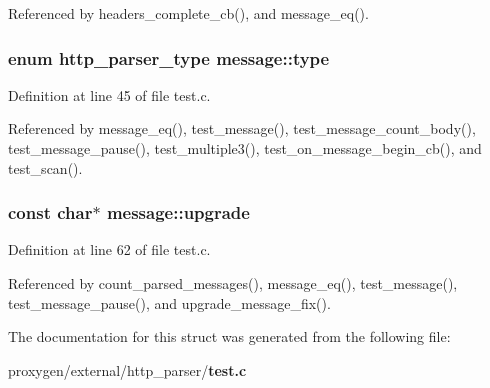 Referenced by headers\+\_\+complete\+\_\+cb(), and message\+\_\+eq().

\subsubsection[{type}]{\setlength{\rightskip}{0pt plus 5cm}enum {\bf http\+\_\+parser\+\_\+type} message\+::type}\label{structmessage_ab7b02b29b5c98045401538b759839aaa}


Definition at line 45 of file test.\+c.



Referenced by message\+\_\+eq(), test\+\_\+message(), test\+\_\+message\+\_\+count\+\_\+body(), test\+\_\+message\+\_\+pause(), test\+\_\+multiple3(), test\+\_\+on\+\_\+message\+\_\+begin\+\_\+cb(), and test\+\_\+scan().

\subsubsection[{upgrade}]{\setlength{\rightskip}{0pt plus 5cm}const char$\ast$ message\+::upgrade}\label{structmessage_ab8fe94f026da047e8bda379ea6f49538}


Definition at line 62 of file test.\+c.



Referenced by count\+\_\+parsed\+\_\+messages(), message\+\_\+eq(), test\+\_\+message(), test\+\_\+message\+\_\+pause(), and upgrade\+\_\+message\+\_\+fix().



The documentation for this struct was generated from the following file\+:\begin{DoxyCompactItemize}
\item 
proxygen/external/http\+\_\+parser/{\bf test.\+c}\end{DoxyCompactItemize}
